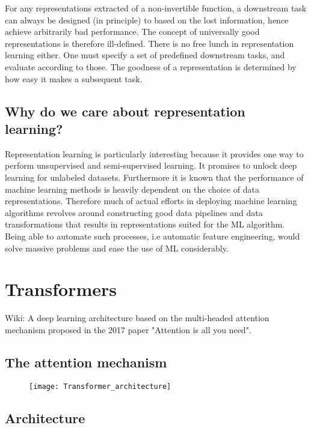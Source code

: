 \documentclass[../../thesis.tex]{subfiles}
\begin{document}
For any representations extracted of a non-invertible function, a downstream task can always be designed (in principle) to based on the lost information, hence achieve arbitrarily bad performance. The concept of universally good representations is therefore ill-defined. There is no free lunch in representation learning either. One must specify a set of predefined downstream tasks, and evaluate according to those. The goodness of a representation is determined by how easy it makes a subsequent task.

\subsection*{Why do we care about representation learning?}

Representation learning is particularly interesting because it provides one way to perform unsupervised and semi-supervised learning. It promises to unlock deep learning for unlabeled datasets. Furthermore it is known that the performance of machine learning methods is heavily dependent on the choice of data representations. Therefore much of actual efforts in deploying machine learning algorithms revolves around constructing good data pipelines and data transformations that results in representations suited for the ML algorithm. Being able to automate such processes, i.e automatic feature engineering, would solve massive problems and ease the use of ML considerably.

\section{Transformers}


Wiki: A deep learning architecture based on the multi-headed attention mechanism proposed in the 2017 paper "Attention is all you need".

\subsection{The attention mechanism}

\begin{figure}[h]
    \texttt{[image: Transformer\_architecture]}
    \centering    
\end{figure}



\subsection{Architecture}
\end{document}
